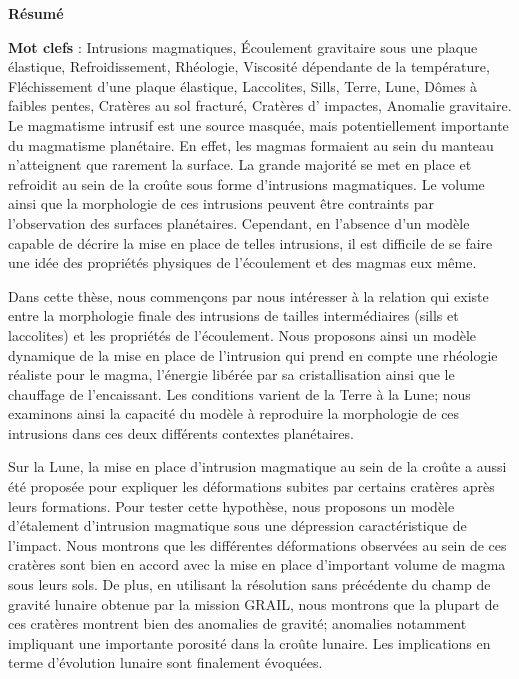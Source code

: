 \thispagestyle{fancy}
\begin{center}
    \Large
    \textbf{Résumé}
\end{center}

\textbf{Mot  clefs} :  Intrusions  magmatiques, Écoulement  gravitaire
sous  une  plaque  élastique,  Refroidissement,  Rhéologie,  Viscosité
dépendante de  la température,  Fléchissement d'une  plaque élastique,
Laccolites, Sills,  Terre, Lune, Dômes  à faibles pentes,  Cratères au
sol fracturé, Cratères d' impactes, Anomalie gravitaire.\\

Le magmatisme  intrusif est  une source masquée,  mais potentiellement
importante du magmatisme planétaire. En effet, les magmas formaient au
sein  du manteau  n'atteignent  que rarement  la  surface.  La  grande
majorité se met en place et refroidit  au sein de la croûte sous forme
d'intrusions magmatiques.  Le  volume ainsi que la  morphologie de ces
intrusions  peuvent être  contraints  par  l’observation des  surfaces
planétaires. Cependant, en l'absence d'un modèle capable de décrire la
mise en place  de telles intrusions, il est difficile  de se faire une
idée des propriétés physiques de l'écoulement et des magmas eux même.

Dans cette  thèse, nous commençons  par nous intéresser à  la relation
qui  existe entre  la  morphologie finale  des  intrusions de  tailles
intermédiaires   (sills   et   laccolites)  et   les   propriétés   de
l'écoulement.  Nous proposons ainsi un  modèle dynamique de la mise en
place de l’intrusion  qui prend en compte une  rhéologie réaliste pour
le  magma,  l'énergie libérée  par  sa  cristallisation ainsi  que  le
chauffage de  l'encaissant. Les  conditions varient de  la Terre  à la
Lune;  nous examinons  ainsi la  capacité  du modèle  à reproduire  la
morphologie  de  ces intrusions  dans  ces  deux différents  contextes
planétaires.

Sur la  Lune, la mise  en place d'intrusion  magmatique au sein  de la
croûte a  aussi été proposée  pour expliquer les  déformations subites
par  certains  cratères après  leurs  formations.   Pour tester  cette
hypothèse, nous proposons un modèle d'étalement d'intrusion magmatique
sous une dépression caractéristique de l'impact. Nous montrons que les
différentes déformations observées  au sein de ces  cratères sont bien
en accord avec la mise en place d'important volume de magma sous leurs
sols. De plus, en utilisant la  résolution sans précédente du champ de
gravité lunaire  obtenue par  la mission GRAIL,  nous montrons  que la
plupart  de  ces cratères  montrent  bien  des anomalies  de  gravité;
anomalies notamment impliquant une  importante porosité dans la croûte
lunaire. Les implications en terme d'évolution lunaire sont finalement
évoquées.

